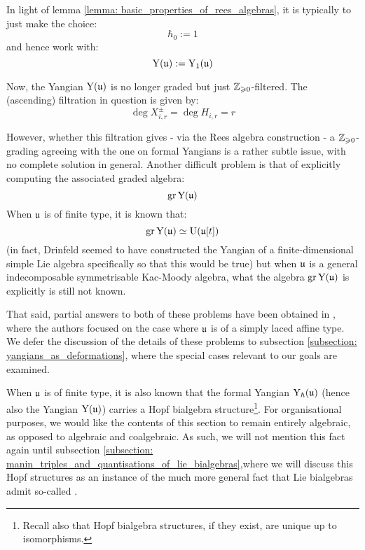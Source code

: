         \begin{convention}
            In light of lemma \ref{lemma: basic_properties_of_rees_algebras}, it is typically to just make the choice:
                $$\hbar_0 := 1$$
            and hence work with:
                $$\mathrm{Y}(\mathfrak{u}) := \mathrm{Y}_1(\mathfrak{u})$$
        \end{convention}
        \begin{remark} \label{remark: positive_Z_filtrations_on_yangians}
            Now, the Yangian $\mathrm{Y}(\mathfrak{u})$ is no longer graded but just $\mathbb{Z}_{\geqslant 0}$-filtered. The (ascending) filtration in question is given by:
                $$\deg X_{i, r}^{\pm} = \deg H_{i, r} = r$$
                
            However, whether this filtration gives - via the Rees algebra construction - a $\mathbb{Z}_{\geqslant 0}$-grading agreeing with the one on formal Yangians is a rather subtle issue, with no complete solution in general. Another difficult problem is that of explicitly computing the associated graded algebra:
                $$\operatorname{gr} \mathrm{Y}(\mathfrak{u})$$
            When $\mathfrak{u}$ is of finite type, it is known that:
                $$\operatorname{gr} \mathrm{Y}(\mathfrak{u}) \simeq \mathrm{U}(\mathfrak{u}[t])$$
            (in fact, Drinfeld seemed to have constructed the Yangian of a finite-dimensional simple Lie algebra specifically so that this would be true) but when $\mathfrak{u}$ is a general indecomposable symmetrisable Kac-Moody algebra, what the algebra $\operatorname{gr} \mathrm{Y}(\mathfrak{u})$ is explicitly is still not known.
            
            That said, partial answers to both of these problems have been obtained in \cite[Section 6]{guay_nakajima_wendlandt_affine_yangian_vertex_representations_and_PBW}, where the authors focused on the case where $\mathfrak{u}$ is of a simply laced affine type. We defer the discussion of the details of these problems to subsection \ref{subsection: yangians_as_deformations}, where the special cases relevant to our goals are examined. 
        \end{remark}

        \begin{remark}
            When $\mathfrak{u}$ is of finite type, it is also known that the formal Yangian $\mathrm{Y}_{\hbar}(\mathfrak{u})$ (hence also the Yangian $\mathrm{Y}(\mathfrak{u})$) carries a Hopf bialgebra structure\footnote{Recall also that Hopf bialgebra structures, if they exist, are unique up to isomorphisms.}. For organisational purposes, we would like the contents of this section to remain entirely algebraic, as opposed to algebraic and coalgebraic. As such, we will not mention this fact again until subsection \ref{subsection: manin_triples_and_quantisations_of_lie_bialgebras},where we will discuss this Hopf structures as an instance of the much more general fact that Lie bialgebras admit so-called . 
        \end{remark}

